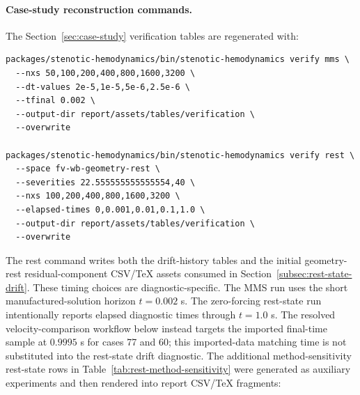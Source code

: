 \paragraph*{Case-study reconstruction commands.}
The Section~\ref{sec:case-study} verification tables are regenerated with:
\begin{lstlisting}[basicstyle=\ttfamily\footnotesize,breaklines=true]
packages/stenotic-hemodynamics/bin/stenotic-hemodynamics verify mms \
  --nxs 50,100,200,400,800,1600,3200 \
  --dt-values 2e-5,1e-5,5e-6,2.5e-6 \
  --tfinal 0.002 \
  --output-dir report/assets/tables/verification \
  --overwrite

packages/stenotic-hemodynamics/bin/stenotic-hemodynamics verify rest \
  --space fv-wb-geometry-rest \
  --severities 22.555555555555554,40 \
  --nxs 100,200,400,800,1600,3200 \
  --elapsed-times 0,0.001,0.01,0.1,1.0 \
  --output-dir report/assets/tables/verification \
  --overwrite
\end{lstlisting}
The rest command writes both the drift-history tables and the initial
geometry-rest residual-component CSV/\TeX{} assets consumed in
Section~\ref{subsec:rest-state-drift}.
These timing choices are diagnostic-specific. The MMS run uses the short
manufactured-solution horizon $t=0.002$ s. The zero-forcing rest-state run
intentionally reports elapsed diagnostic times through $t=1.0$ s. The resolved
velocity-comparison workflow below instead targets the imported final-time
sample at $0.9995$ s for cases 77 and 60; this imported-data matching time is
not substituted into the rest-state drift diagnostic.
The additional method-sensitivity rest-state rows in
Table~\ref{tab:rest-method-sensitivity} were generated as auxiliary experiments
and then rendered into report CSV/\TeX{} fragments:
